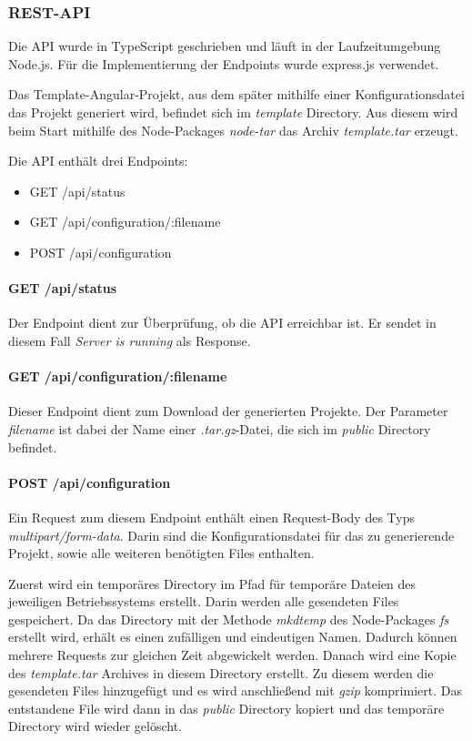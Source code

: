 \subsubsection{REST-API}
Die API wurde in TypeScript geschrieben und läuft in der Laufzeitumgebung Node.js.
Für die Implementierung der Endpoints wurde express.js verwendet.

Das Template-Angular-Projekt, aus dem später mithilfe einer Konfigurationsdatei das Projekt generiert wird,
befindet sich im \textit{template} Directory.
Aus diesem wird beim Start mithilfe des Node-Packages \textit{node-tar} das Archiv \textit{template.tar} erzeugt.

Die API enthält drei Endpoints:

\begin{itemize}
    \item GET /api/status
    \item GET /api/configuration/:filename
    \item POST /api/configuration
\end{itemize}

\paragraph{GET /api/status}
Der Endpoint dient zur Überprüfung, ob die API erreichbar ist.
Er sendet in diesem Fall \textit{Server is running} als Response.

\paragraph{GET /api/configuration/:filename}
Dieser Endpoint dient zum Download der generierten Projekte.
Der Parameter \textit{filename} ist dabei der Name einer \textit{.tar.gz}-Datei, die sich im \textit{public}
Directory befindet.

\paragraph{POST /api/configuration}
Ein Request zum diesem Endpoint enthält einen Request-Body des Typs
\textit{multipart/form-data}.
Darin sind die Konfigurationsdatei für das zu generierende Projekt, sowie alle weiteren benötigten Files enthalten.

Zuerst wird ein temporäres Directory im Pfad für temporäre Dateien des jeweiligen Betriebssystems erstellt.
Darin werden alle gesendeten Files gespeichert.
Da das Directory mit der Methode \textit{mkdtemp} des Node-Packages \textit{fs} erstellt wird, erhält es einen
zufälligen und eindeutigen Namen.
Dadurch können mehrere Requests zur gleichen Zeit abgewickelt werden.
Danach wird eine Kopie des \textit{template.tar} Archives in diesem Directory erstellt.
Zu diesem werden die gesendeten Files hinzugefügt und es wird anschließend mit \textit{gzip} komprimiert.
Das entstandene File wird dann in das \textit{public} Directory kopiert und das temporäre Directory wird wieder gelöscht.

